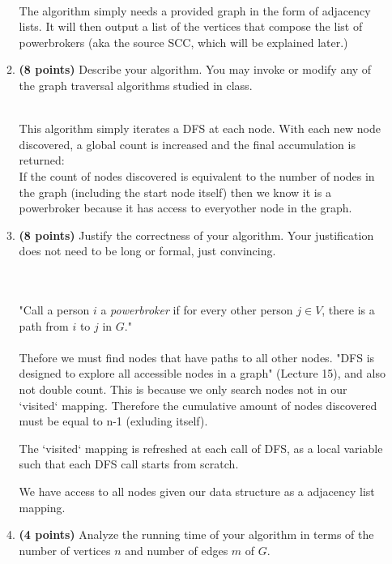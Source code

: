 \documentclass[11pt]{article}
\theoremstyle{definition}
\theoremstyle{theorem}
\newcommand{\solution}{\medskip\noindent{\color{DarkBlue}\textbf{Solution:}}}
\begin{document}
\begin{enumerate}[label=(\alph*)]
\begin{enumerate}[label=(\roman*)]
\solution \\

The algorithm simply needs a provided graph in the form of adjacency lists. It will then output a list of the vertices that compose the list of powerbrokers (aka the source SCC, which will be explained later.)

    
  \item  \textbf{(8 points)} Describe your algorithm.  You may invoke or
    modify any of the graph traversal algorithms studied in class.

\solution \\



This algorithm simply iterates a DFS at each node. With each new node discovered, 
a global count is increased and the final accumulation is returned:\\
If the count of nodes discovered is equivalent to the number of nodes in the graph
 (including the start node itself) then we know it is a powerbroker because it has
  access to everyother node in the graph. 

  \item \textbf{(8 points)}
    Justify the correctness of your algorithm.  Your justification does
    not need to be long or formal, just convincing.

\solution \\\\
"Call a person $i$ a {\em powerbroker}\/ if for every other person $j
\in V$, there is a path from $i$ to $j$ in $G$."\\\\

Thefore we must find nodes that have paths to all other nodes. 
"DFS is designed to explore all accessible nodes in a graph" (Lecture 15), and also not double count. 
This is because we only search nodes not in our `visited` mapping.
Therefore the cumulative amount of nodes discovered must be equal to n-1 (exluding itself).

The `visited` mapping is refreshed at each call of DFS,
as a local variable such that each DFS call starts from scratch.

We have access to all nodes given our data structure as a adjacency list mapping.




  \item  \textbf{(4 points)} Analyze the running time of your algorithm in terms of the
    number of vertices $n$ and number of edges $m$ of $G$.


\end{enumerate}
\end{enumerate}
\end{document}
